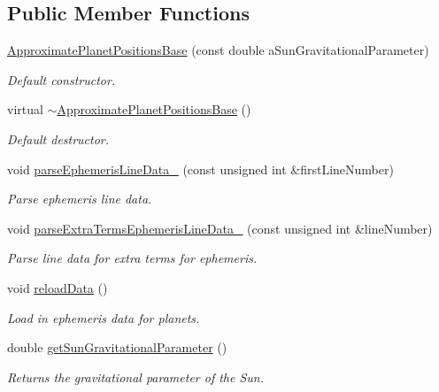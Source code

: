 \subsection*{Public Member Functions}
\begin{DoxyCompactItemize}
\item 
\hyperlink{classtudat_1_1ephemerides_1_1ApproximatePlanetPositionsBase_af74c02e220004c26042d40d1a935e02e}{Approximate\+Planet\+Positions\+Base} (const double a\+Sun\+Gravitational\+Parameter)
\begin{DoxyCompactList}\small\item\em Default constructor. \end{DoxyCompactList}\item 
virtual \hyperlink{classtudat_1_1ephemerides_1_1ApproximatePlanetPositionsBase_a9e8f9ead05a2dc897153caed1fbbbf78}{$\sim$\+Approximate\+Planet\+Positions\+Base} ()\hypertarget{classtudat_1_1ephemerides_1_1ApproximatePlanetPositionsBase_a9e8f9ead05a2dc897153caed1fbbbf78}{}\label{classtudat_1_1ephemerides_1_1ApproximatePlanetPositionsBase_a9e8f9ead05a2dc897153caed1fbbbf78}

\begin{DoxyCompactList}\small\item\em Default destructor. \end{DoxyCompactList}\item 
void \hyperlink{classtudat_1_1ephemerides_1_1ApproximatePlanetPositionsBase_aef19d67979b73f546c2fa448bcbfcbed}{parse\+Ephemeris\+Line\+Data\+\_\+} (const unsigned int \&first\+Line\+Number)
\begin{DoxyCompactList}\small\item\em Parse ephemeris line data. \end{DoxyCompactList}\item 
void \hyperlink{classtudat_1_1ephemerides_1_1ApproximatePlanetPositionsBase_af5aa54a364f7cc6429e4df57438236be}{parse\+Extra\+Terms\+Ephemeris\+Line\+Data\+\_\+} (const unsigned int \&line\+Number)
\begin{DoxyCompactList}\small\item\em Parse line data for extra terms for ephemeris. \end{DoxyCompactList}\item 
void \hyperlink{classtudat_1_1ephemerides_1_1ApproximatePlanetPositionsBase_a568eb00d49ec2d6ddda6fe353b20975b}{reload\+Data} ()
\begin{DoxyCompactList}\small\item\em Load in ephemeris data for planets. \end{DoxyCompactList}\item 
double \hyperlink{classtudat_1_1ephemerides_1_1ApproximatePlanetPositionsBase_abc58628f9a8defcd5bc8b8d9df778f98}{get\+Sun\+Gravitational\+Parameter} ()
\begin{DoxyCompactList}\small\item\em Returns the gravitational parameter of the Sun. \end{DoxyCompactList}\end{DoxyCompactItemize}
